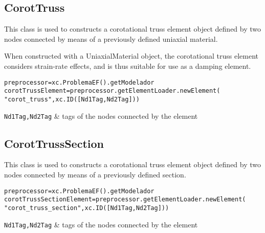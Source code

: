 \subsection{CorotTruss}
This class is used to constructs a corotational truss element object defined by two nodes connected by means of a previously defined uniaxial material.

When constructed with a UniaxialMaterial object, the corotational truss element considers strain-rate effects, and is thus suitable for use as a damping element.
\begin{verbatim}
preprocessor=xc.ProblemaEF().getModelador
corotTrussElement=preprocessor.getElementLoader.newElement(
"corot_truss",xc.ID([Nd1Tag,Nd2Tag]))
\end{verbatim}
\begin{paramFuncTable}
{\tt Nd1Tag,Nd2Tag} & tags of the nodes connected by the element\\
\end{paramFuncTable}

\begin{paramClassTable}
\ElementParam{}
\ElementOneDParam{}
\CorotTrussParam{}
\end{paramClassTable}

\begin{methodsTable}
\ElementMeth{}
\ElementOneDMeth{}
\ProtoTrussMeth{}
\CorotTrussMeth{}
\end{methodsTable}

\subsection{CorotTrussSection}
This class is used to constructs a corotational truss element object defined by two nodes connected by means of a previously defined section.

\begin{verbatim}
preprocessor=xc.ProblemaEF().getModelador
corotTrussSectionElement=preprocessor.getElementLoader.newElement(
"corot_truss_section",xc.ID([Nd1Tag,Nd2Tag]))
\end{verbatim}
\begin{paramFuncTable}
{\tt Nd1Tag,Nd2Tag} & tags of the nodes connected by the element\\
\end{paramFuncTable}

\begin{paramClassTable}
\ElementParam{}
\ElementOneDParam{}
\end{paramClassTable}


